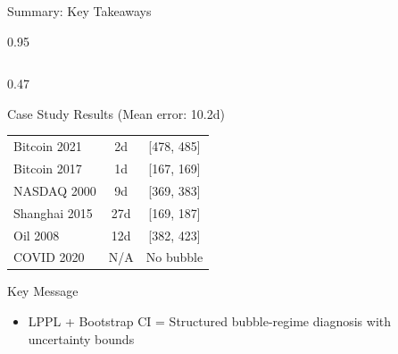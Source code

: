 \documentclass[9pt, aspectratio=169, t]{beamer}
\begin{document}
\begin{frame}{Summary: Key Takeaways}
\begin{cminipage}{0.95\textwidth}
{\begin{columns}[T]
\begin{column}{0.47\textwidth}
\begin{exampleblock}{Case Study Results (Mean error: 10.2d)}
{\begin{center}
\begin{tabular}{lcc}
                        \midrule
                        Bitcoin 2021 & 2d & [478, 485] \\
                        Bitcoin 2017 & 1d & [167, 169] \\
                        NASDAQ 2000 & 9d & [369, 383] \\
                        Shanghai 2015 & 27d & [169, 187] \\
                        Oil 2008 & 12d & [382, 423] \\
                        COVID 2020 & N/A & No bubble \\
                        \bottomrule
                    \end{tabular}
                \end{center}
                }
            \end{exampleblock}
            \vspace{-2mm}
            \begin{block}{Key Message}
                \begin{itemize}\setlength{\itemsep}{0pt}
                    \item LPPL + Bootstrap CI = Structured bubble-regime diagnosis with uncertainty bounds
                \end{itemize}
            \end{block}
        \end{column}
    \end{columns}
    }
    \end{cminipage}
\end{frame}
\end{document}
